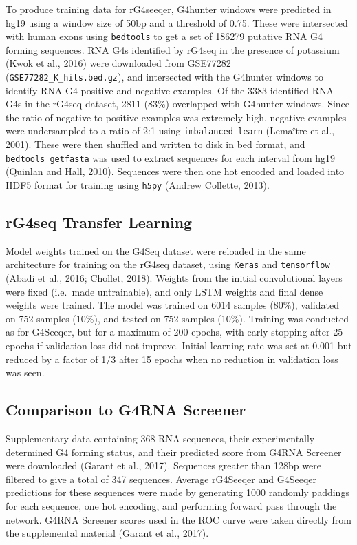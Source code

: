 \documentclass[12pt,a4paper,]{report}
\begin{document}
To produce training data for rG4seeqer, G4hunter windows were predicted
in hg19 using a window size of 50bp and a threshold of 0.75. These were
intersected with human exons using \texttt{bedtools} to get a set of
186279 putative RNA G4 forming sequences. RNA G4s identified by rG4seq
in the presence of potassium (Kwok et al., 2016) were downloaded from
GSE77282 (\texttt{GSE77282\_K\_hits.bed.gz}), and intersected with the
G4hunter windows to identify RNA G4 positive and negative examples. Of
the 3383 identified RNA G4s in the rG4seq dataset, 2811 (83\%)
overlapped with G4hunter windows. Since the ratio of negative to
positive examples was extremely high, negative examples were
undersampled to a ratio of 2:1 using \texttt{imbalanced-learn} (Lemaître
et al., 2001). These were then shuffled and written to disk in bed
format, and \texttt{bedtools\ getfasta} was used to extract sequences
for each interval from hg19 (Quinlan and Hall, 2010). Sequences were
then one hot encoded and loaded into HDF5 format for training using
\texttt{h5py} (Andrew Collette, 2013).

\hypertarget{rg4seq-transfer-learning}{%
\subsection{rG4seq Transfer Learning}\label{rg4seq-transfer-learning}}

Model weights trained on the G4Seq dataset were reloaded in the same
architecture for training on the rG4seq dataset, using \texttt{Keras}
and \texttt{tensorflow} (Abadi et al., 2016; Chollet, 2018). Weights
from the initial convolutional layers were fixed (i.e.~made
untrainable), and only LSTM weights and final dense weights were
trained. The model was trained on 6014 samples (80\%), validated on 752
samples (10\%), and tested on 752 samples (10\%). Training was conducted
as for G4Seeqer, but for a maximum of 200 epochs, with early stopping
after 25 epochs if validation loss did not improve. Initial learning
rate was set at 0.001 but reduced by a factor of 1/3 after 15 epochs
when no reduction in validation loss was seen.

\hypertarget{comparison-to-g4rna-screener}{%
\subsection{Comparison to G4RNA
Screener}\label{comparison-to-g4rna-screener}}

Supplementary data containing 368 RNA sequences, their experimentally
determined G4 forming status, and their predicted score from G4RNA
Screener were downloaded (Garant et al., 2017). Sequences greater than
128bp were filtered to give a total of 347 sequences. Average rG4Seeqer
and G4Seeqer predictions for these sequences were made by generating
1000 randomly paddings for each sequence, one hot encoding, and
performing forward pass through the network. G4RNA Screener scores used
in the ROC curve were taken directly from the supplemental material
(Garant et al., 2017).
\end{document}
